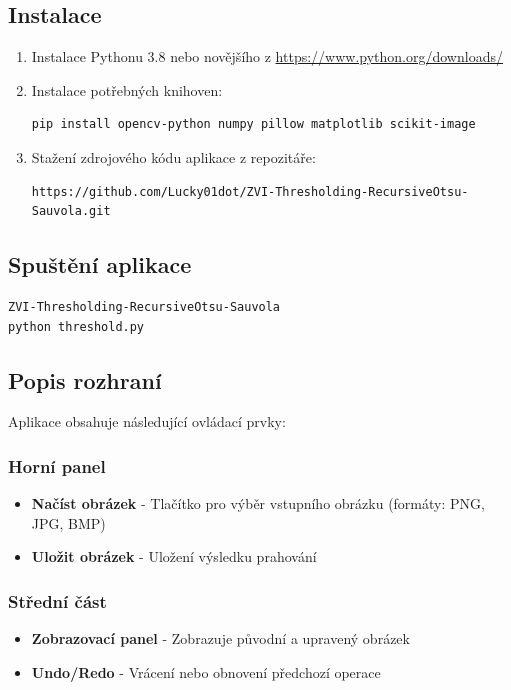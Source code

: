 \documentclass[12pt,a4paper]{article}
\begin{document}
\subsection{Instalace}
\begin{enumerate}
\item Instalace Pythonu 3.8 nebo novějšího z \url{https://www.python.org/downloads/}
\item Instalace potřebných knihoven:
\begin{verbatim}
pip install opencv-python numpy pillow matplotlib scikit-image
\end{verbatim}
\item Stažení zdrojového kódu aplikace z repozitáře:
\begin{verbatim}
https://github.com/Lucky01dot/ZVI-Thresholding-RecursiveOtsu-Sauvola.git
\end{verbatim}
\end{enumerate}

\subsection{Spuštění aplikace}
\begin{verbatim}
ZVI-Thresholding-RecursiveOtsu-Sauvola
python threshold.py
\end{verbatim}

\subsection{Popis rozhraní}


Aplikace obsahuje následující ovládací prvky:

\subsubsection{Horní panel}
\begin{itemize}
\item \textbf{Načíst obrázek} - Tlačítko pro výběr vstupního obrázku (formáty: PNG, JPG, BMP)
\item \textbf{Uložit obrázek} - Uložení výsledku prahování
\end{itemize}

\subsubsection{Střední část}
\begin{itemize}
\item \textbf{Zobrazovací panel} - Zobrazuje původní a upravený obrázek
\item \textbf{Undo/Redo} - Vrácení nebo obnovení předchozí operace
\end{itemize}
\end{document}
